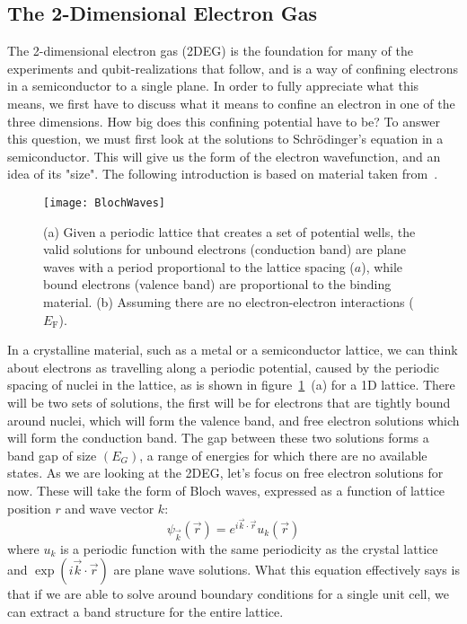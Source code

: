 \subsection{The 2-Dimensional Electron Gas}
The 2-dimensional electron gas (2DEG) is the foundation for many of the experiments and qubit-realizations
that follow, and is a way of confining electrons in a semiconductor to a single plane. In order to fully
appreciate what this means, we first have to discuss what it means to confine an electron in one of the three dimensions.
How big does this confining potential have to be? To answer this question, we must first look at the solutions
to Schr\"odinger's equation in a semiconductor. This will give us the form of the electron wavefunction, and
an idea of its "size". The following introduction is based on material taken from~\cite{delftbook,ihnbook,Ashcroft}. 

\begin{figure}
  \texttt{[image: BlochWaves]}
  \caption[Bloch Waves on a regular lattice]
  {(a) Given a periodic lattice that creates a set of potential wells, the valid solutions for unbound
   electrons (conduction band) are plane waves with a period proportional to the lattice spacing ($a$),
   while bound electrons (valence band) are proportional to the binding material. (b) Assuming there are no 
   electron-electron interactions ($E_\textrm{F}$).}
  \label{fig:blochwaves}
\end{figure}

In a crystalline material, such as a metal or a semiconductor lattice, we can think
about electrons as travelling along a periodic potential, caused by the periodic spacing of nuclei in the lattice, as
is shown in figure~\ref{fig:blochwaves}~(a) for a 1D lattice. There will be two sets of solutions, the first will be for electrons
that are tightly bound around nuclei, which will form the valence band, and free electron solutions which
will form the conduction band. The gap between these two solutions forms a band gap of size $(E_G)$, a range
of energies for which there are no available states. As we are looking at the 2DEG, let's focus on free electron solutions for now.
These will take the form of Bloch waves, expressed as a function of lattice position $r$ and wave vector $k$:
\begin{equation}
  \psi_{\vec{k}}(\vec{r}) = e^{i\vec{k} \cdot \vec{r}}u_k(\vec{r})
\end{equation}
where $u_k$ is a periodic function with the same periodicity as the crystal lattice and $\exp\left(i\vec{k} \cdot \vec{r}\right)$ are
plane wave solutions. What this equation effectively says is that if we are able to solve around boundary conditions for
a single unit cell, we can extract a band structure for the entire lattice.


